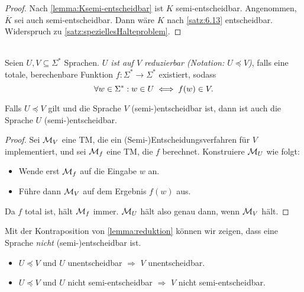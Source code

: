 \begin{proof}
	Nach \autoref{lemma:Ksemi-entscheidbar} ist $K$ semi-entscheidbar. 
	Angenommen, $\overline{K}$ sei auch semi-entscheidbar.
	Dann wäre $K$ nach \autoref{satz:6.13} entscheidbar.
	Widerspruch zu \autoref{satz:speziellesHalteproblem}.
\end{proof}


\begin{Def}[Reduktion]\label{def:reduktion}\ \\
  Seien $U, V \subseteq \Sigma^*$ Sprachen.
  \emph{$U$ ist auf $V$ reduzierbar (Notation: $U \preceq V$)}, falls eine totale, berechenbare Funktion
  $f:\Sigma^* \to \Sigma^*$ existiert, sodass
  \[
    \forall w \in \Sigma^*:w \in U \iff f(w) \in V. \qedhere
  \]

\end{Def}
\begin{lemma}\label{lemma:reduktion}
  Falls $U \preceq V$ gilt und die Sprache $V$ \mbox{(semi-)entscheidbar} ist, dann ist auch die Sprache $U$
  \mbox{(semi-)entscheidbar}.
\end{lemma}
\begin{proof}
  Sei $\mathcal{M}_V$ eine \ac{TM}, die ein (Semi-)Entscheidungsverfahren für $V$ implementiert,
  und sei $\mathcal{M}_f$ eine \ac{TM}, die $f$ berechnet.
  Konstruiere $\mathcal{M}_U$ wie folgt:
  \begin{itemize}
  \item Wende erst $\mathcal{M}_f$ auf die Eingabe $w$ an.
  \item Führe dann $\mathcal{M}_V$ auf dem Ergebnis $f(w)$ aus.
  \end{itemize}
  Da $f$ total ist, hält $\mathcal{M}_f$ immer.
  $\mathcal{M}_U$ hält also genau dann, wenn $\mathcal{M}_V$ hält.
\end{proof}

\begin{Bemerkung} Mit der Kontraposition von \autoref{lemma:reduktion} können wir zeigen, dass eine Sprache \emph{nicht} \mbox{(semi-)entscheidbar} ist.
\begin{itemize}
 \item $U \preceq V$ und $U$ unentscheidbar $\Rightarrow$ $V$ unentscheidbar.
 \item $U \preceq V$ und $U$ nicht semi-entscheidbar $\Rightarrow$ $V$ nicht semi-entscheidbar.
 \qedhere
\end{itemize}
\end{Bemerkung}

